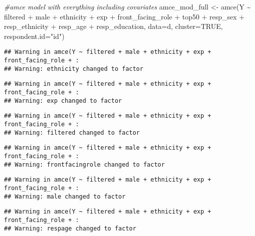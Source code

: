 \documentclass[
]{article}
\newenvironment{Shaded}{\begin{snugshade}}{\end{snugshade}}
\newcommand{\AttributeTok}[1]{\textcolor[rgb]{0.77,0.63,0.00}{#1}}
\newcommand{\CommentTok}[1]{\textcolor[rgb]{0.56,0.35,0.01}{\textit{#1}}}
\newcommand{\ConstantTok}[1]{\textcolor[rgb]{0.00,0.00,0.00}{#1}}
\newcommand{\FunctionTok}[1]{\textcolor[rgb]{0.00,0.00,0.00}{#1}}
\newcommand{\NormalTok}[1]{#1}
\newcommand{\OtherTok}[1]{\textcolor[rgb]{0.56,0.35,0.01}{#1}}
\newcommand{\SpecialCharTok}[1]{\textcolor[rgb]{0.00,0.00,0.00}{#1}}
\newcommand{\StringTok}[1]{\textcolor[rgb]{0.31,0.60,0.02}{#1}}
\begin{document}
\begin{Shaded}
\begin{Highlighting}[]
\CommentTok{\#amce model with everything including covariates}
\NormalTok{amce\_mod\_full }\OtherTok{\textless{}{-}} \FunctionTok{amce}\NormalTok{(Y }\SpecialCharTok{\textasciitilde{}}\NormalTok{ filtered }\SpecialCharTok{+}\NormalTok{ male }\SpecialCharTok{+}\NormalTok{ ethnicity }\SpecialCharTok{+}\NormalTok{ exp }\SpecialCharTok{+}\NormalTok{ front\_facing\_role }\SpecialCharTok{+}\NormalTok{ top50 }\SpecialCharTok{+}\NormalTok{ resp\_sex }\SpecialCharTok{+}\NormalTok{ resp\_ethnicity }\SpecialCharTok{+}\NormalTok{ resp\_age }\SpecialCharTok{+}\NormalTok{ resp\_education, }\AttributeTok{data=}\NormalTok{d,}
                \AttributeTok{cluster=}\ConstantTok{TRUE}\NormalTok{, }\AttributeTok{respondent.id=}\StringTok{"id"}\NormalTok{)}
\end{Highlighting}
\end{Shaded}

\begin{verbatim}
## Warning in amce(Y ~ filtered + male + ethnicity + exp + front_facing_role + :
## Warning: ethnicity changed to factor
\end{verbatim}

\begin{verbatim}
## Warning in amce(Y ~ filtered + male + ethnicity + exp + front_facing_role + :
## Warning: exp changed to factor
\end{verbatim}

\begin{verbatim}
## Warning in amce(Y ~ filtered + male + ethnicity + exp + front_facing_role + :
## Warning: filtered changed to factor
\end{verbatim}

\begin{verbatim}
## Warning in amce(Y ~ filtered + male + ethnicity + exp + front_facing_role + :
## Warning: frontfacingrole changed to factor
\end{verbatim}

\begin{verbatim}
## Warning in amce(Y ~ filtered + male + ethnicity + exp + front_facing_role + :
## Warning: male changed to factor
\end{verbatim}

\begin{verbatim}
## Warning in amce(Y ~ filtered + male + ethnicity + exp + front_facing_role + :
## Warning: respage changed to factor
\end{verbatim}
\end{document}
